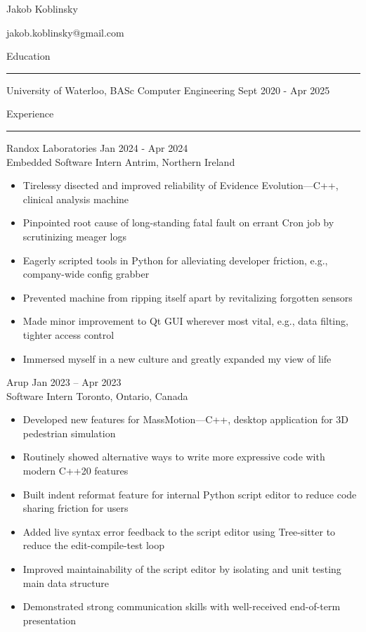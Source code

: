 \documentclass{article}
\begin{document}

\begin{center}
{\huge Jakob Koblinsky}

jakob.koblinsky@gmail.com
\end{center}

\vspace{0.25in}

{\large Education}

\vspace{-1em}
\rule{\linewidth}{0.4pt}

University of Waterloo, BASc Computer Engineering \hfill Sept 2020 - Apr 2025

\vspace{1em}

{\large Experience}

\vspace{-1em}
\rule{\linewidth}{0.4pt}

Randox Laboratories \hfill Jan 2024 - Apr 2024 \\
Embedded Software Intern \hfill Antrim, Northern Ireland
\begin{itemize}[noitemsep,left=0pt,label={--}]
	\item Tirelessy disected and improved reliability of Evidence Evolution---C++, clinical analysis machine
	\item Pinpointed root cause of long-standing fatal fault on errant Cron job by scrutinizing meager logs
	\item Eagerly scripted tools in Python for alleviating developer friction, e.g., company-wide config grabber
	\item Prevented machine from ripping itself apart by revitalizing forgotten sensors
	\item Made minor improvement to Qt GUI wherever most vital, e.g., data filting, tighter access control
	\item Immersed myself in a new culture and greatly expanded my view of life
\end{itemize}

Arup \hfill Jan 2023 – Apr 2023 \\
Software Intern \hfill Toronto, Ontario, Canada
\begin{itemize}[noitemsep,left=0pt,label={--}]
	\item Developed new features for MassMotion—C++, desktop application for 3D pedestrian simulation
	\item Routinely showed alternative ways to write more expressive code with modern C++20 features
	\item Built indent reformat feature for internal Python script editor to reduce code sharing friction for users
	\item Added live syntax error feedback to the script editor using Tree-sitter to reduce the edit-compile-test loop
	\item Improved maintainability of the script editor by isolating and unit testing main data structure
	\item Demonstrated strong communication skills with well-received end-of-term presentation
\end{itemize}
\end{document}
